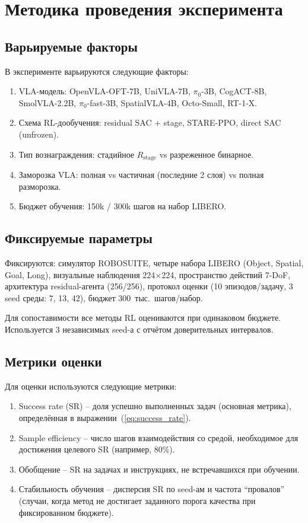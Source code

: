 \section{Методика проведения эксперимента}
\label{sec:methodology}

\subsection{Варьируемые факторы}
\label{subsec:factors}

    В эксперименте варьируются следующие факторы:

\begin{enumerate}
    \item VLA-модель: OpenVLA-OFT-7B, UniVLA-7B, $\pi_0$-3B, CogACT-8B, SmolVLA-2.2B, $\pi_0$-fast-3B, SpatialVLA-4B, Octo-Small, RT-1-X.
    \item Схема RL-дообучения: residual SAC + stage, STARE-PPO, direct SAC (unfrozen).
    \item Тип вознаграждения: стадийное $R_{\text{stage}}$ vs разреженное бинарное.
    \item Заморозка VLA: полная vs частичная (последние 2 слоя) vs полная разморозка.
    \item Бюджет обучения: 150k / 300k шагов на набор LIBERO.
\end{enumerate}

\subsection{Фиксируемые параметры}
\label{subsec:fixed}

    Фиксируются: симулятор ROBOSUITE, четыре набора LIBERO (Object, Spatial, Goal, Long), визуальные наблюдения 224$\times$224, пространство действий 7-DoF, архитектура residual-агента (256/256), протокол оценки (10 эпизодов/задачу, 3 seed среды: 7, 13, 42), бюджет 300~тыс.\ шагов/набор.

    Для сопоставимости все методы RL оцениваются при одинаковом бюджете. Используется 3 независимых seed-а с отчётом доверительных интервалов.

\subsection{Метрики оценки}
\label{subsec:metrics}

    Для оценки используются следующие метрики:

\begin{enumerate}
    \item Success rate (SR) -- доля успешно выполненных задач (основная метрика), определённая в выражении~(\ref{eq:success_rate}).
    \item Sample efficiency -- число шагов взаимодействия со средой, необходимое для достижения целевого SR (например, 80\%).
    \item Обобщение -- SR на задачах и инструкциях, не встречавшихся при обучении.
    \item Стабильность обучения -- дисперсия SR по seed-ам и частота ``провалов'' (случаи, когда метод не достигает заданного порога качества при фиксированном бюджете).
\end{enumerate}

